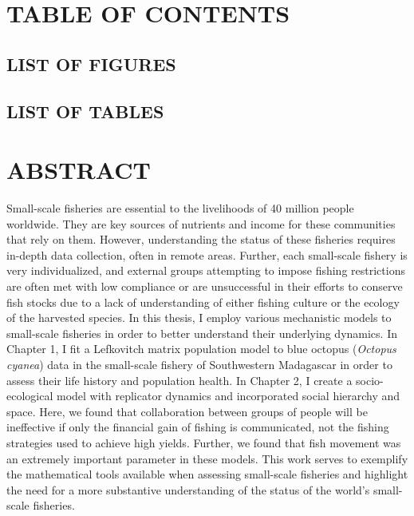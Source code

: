 \documentclass[
  12pt,
]{article}
\begin{document}
\newpage

\hypertarget{table-of-contents}{%
\section{TABLE OF CONTENTS}\label{table-of-contents}}

\vspace{-1cm}
\tableofcontents

\newpage

\hypertarget{list-of-figures}{%
\subsection{LIST OF FIGURES}\label{list-of-figures}}

\vspace{-1.5cm}
\listoffigures

\newpage

\hypertarget{list-of-tables}{%
\subsection{LIST OF TABLES}\label{list-of-tables}}

\vspace{-1.5cm}
\listoftables

\newpage

\hypertarget{abstract}{%
\section{ABSTRACT}\label{abstract}}

Small-scale fisheries are essential to the livelihoods of 40 million people worldwide. They are key sources of nutrients and income for these communities that rely on them. However, understanding the status of these fisheries requires in-depth data collection, often in remote areas. Further, each small-scale fishery is very individualized, and external groups attempting to impose fishing restrictions are often met with low compliance or are unsuccessful in their efforts to conserve fish stocks due to a lack of understanding of either fishing culture or the ecology of the harvested species. In this thesis, I employ various mechanistic models to small-scale fisheries in order to better understand their underlying dynamics. In Chapter 1, I fit a Lefkovitch matrix population model to blue octopus (\emph{Octopus cyanea}) data in the small-scale fishery of Southwestern Madagascar in order to assess their life history and population health. In Chapter 2, I create a socio-ecological model with replicator dynamics and incorporated social hierarchy and space. Here, we found that collaboration between groups of people will be ineffective if only the financial gain of fishing is communicated, not the fishing strategies used to achieve high yields. Further, we found that fish movement was an extremely important parameter in these models. This work serves to exemplify the mathematical tools available when assessing small-scale fisheries and highlight the need for a more substantive understanding of the status of the world's small-scale fisheries.
\end{document}
